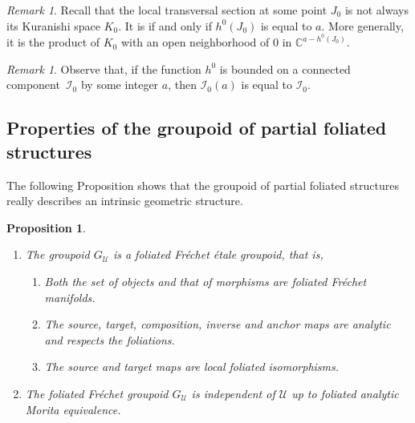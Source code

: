 \documentclass[10pt]{amsart}
\let\mathcal\mathscr
\renewcommand{\theenumi}{\roman{enumi}}%
\theoremstyle{plain}
\newtheorem{proposition}[theorem]{Proposition}
\theoremstyle{definition}
\theoremstyle{remark}
\newtheorem{remark}[theorem]{Remark}
\numberwithin{equation}{section}
\newcommand{\CC}{{\mathbb{C}}}
\newcommand{\cI}{\mathcal{I}}
\providecommand{\skpt}{\par\smallskip\noindent}
\begin{document}
\begin{remark}
\label{newK}
Recall that the local transversal section at some point $J_0$ is not always its Kuranishi space $K_0$. It is if and only if $h^0(J_0)$ is equal to $a$. More generally, it is the product of $K_0$ with an open neighborhood of $0$ in $\CC^{a-h^0(J_0)}$.
\end{remark}

\begin{remark}
\label{CaETI}
Observe that, if the function $h^0$ is bounded on a connected component~$\cI_0$ by some integer $a$, then $\cI_0(a)$ is equal to $\cI_0$.
\end{remark}

\subsection{Properties of the groupoid of partial foliated structures}
\label{groupoidpfs}

The following Proposition shows that the groupoid of partial foliated structures really describes an intrinsic geometric structure.

\skpt
\begin{proposition}
\label{groupoidI}
\begin{enumerate}\renewcommand{\theenumi}{\Roman{enumi}}\renewcommand{\theenumii}{\roman{enumii}}
\item\label{groupoidI1}
The groupoid $G_{\mathcal U}$ is a foliated Fréchet étale groupoid, that is,
\begin{enumerate}
\item\label{groupoidI1i}
Both the set of objects and that of morphisms are foliated Fréchet manifolds.
\item\label{groupoidI1ii}
The source, target, composition, inverse and anchor maps are analytic and respects the foliations.
\item\label{groupoidI1iii}
The source and target maps are local foliated isomorphisms.
\end{enumerate}
\item\label{groupoidI2}
The foliated Fréchet groupoid $G_{\mathcal U}$ is independent of $\mathcal U$ up to foliated analytic Morita equivalence.
\end{enumerate}
\end{proposition}
\end{document}

